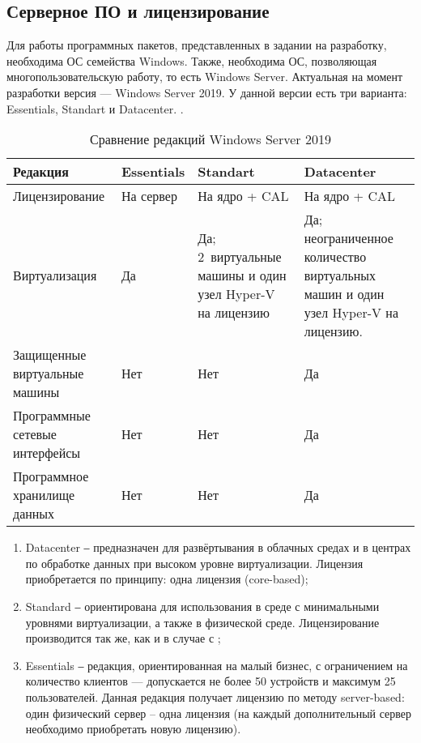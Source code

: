\subsection{Серверное ПО и лицензирование}

Для работы программных пакетов, представленных в задании на разработку, необходима ОС
семейства Windows. Также, необходима ОС, позволяющая многопользовательскую работу, то
есть Windows Server. Актуальная на момент разработки версия — Windows Server 2019. У
данной версии есть три варианта: Essentials, Standart и Datacenter.
\cite{ref:win_srv_overview}\cite{ref:win_srv_comp}.

\begin{table}[h]
    \centering
    \caption{Сравнение редакций Windows Server 2019}
    \label{tab:win_srv_comp}
    \begin{tabu}to \linewidth{X[1,c,m]X[1,c,m]X[1,c,m]X[1,c,m]}
        \toprule
        Редакция & Essentials & Standart & Datacenter \\
        \midrule
        Лицензирование & На сервер & На ядро + CAL & На ядро + CAL \\
        Виртуализация & Да & Да; 2~виртуальные
        машины и один узел Hyper-V на лицензию & Да; неограниченное количество
        виртуальных машин и один узел Hyper-V на лицензию. \\
        Защищенные виртуальные машины & Нет & Нет & Да \\
        Программные сетевые интерфейсы & Нет & Нет & Да \\
        Программное хранилище данных & Нет & Нет & Да \\
        \bottomrule
    \end{tabu}
\end{table}

\begin{enumerate}
    \item Datacenter ‒ предназначен для развёртывания в облачных средах и в центрах по
        обработке данных при высоком уровне виртуализации. Лицензия приобретается по
        принципу: одна лицензия  (core-based);
    \item Standard ‒ ориентирована для использования в среде с минимальными уровнями
        виртуализации, а также в физической среде. Лицензирование производится так же,
        как и в случае с ;
    \item Essentials ‒ редакция, ориентированная на малый бизнес, с ограничением на
        количество клиентов — допускается не более 50 устройств и максимум 25
        пользователей. Данная редакция получает лицензию по методу server-based:
        один физический сервер – одна лицензия (на каждый дополнительный сервер
        необходимо приобретать новую лицензию).
\end{enumerate}

